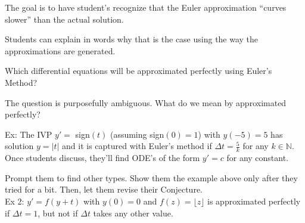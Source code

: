 \begin{annotation}
	\begin{Goals}
		The goal is to have student's recognize that the Euler approximation ``curves slower'' than the actual solution.
		
		Students can explain in words why that is the case using the way the approximations are generated.
	\end{Goals}
\end{annotation}


\bookonlynewpage



\question
	Which differential equations will be approximated perfectly using Euler's Method?

\begin{annotation}
	\begin{Goals}
		The question is purposefully ambiguous.
		What do we mean by approximated perfectly?
		
		Ex: The IVP $y'=$ sign$(t)$ (assuming sign$(0)=1$) with $y(-5)=5$ has solution $y = |t|$ and it is captured with Euler's method if $\Delta t=\frac5k$ for any $k\in\mathbb{N}$. \\
		
		Once students discuss, they'll find ODE's of the form $y'= c$ for any constant. 
		
		Prompt them to find other types. Show them the example above only after they tried for a bit. 
		Then, let them revise their Conjecture.  \\
		
		Ex 2: $y'=f(y+t)$ with $y(0)=0$ and $f(z) = \lfloor z \rfloor$ is approximated perfectly if $\Delta t = 1$, but not if $\Delta t$ takes any other value.
		
	\end{Goals}
\end{annotation}















%
%
%
%
%
%
%

